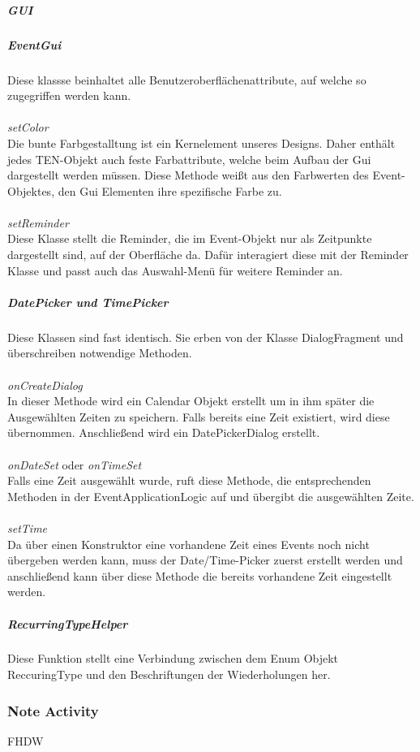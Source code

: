 \subparagraph{GUI}
\subparagraph*{EventGui}
Diese klassse beinhaltet alle Benutzeroberflächenattribute, auf welche so zugegriffen werden kann.\\
\\
\textit{setColor}\\
Die bunte Farbgestalltung ist ein Kernelement unseres Designs. Daher enthält jedes TEN-Objekt auch feste Farbattribute, welche beim Aufbau der Gui dargestellt werden müssen. Diese Methode weißt aus den Farbwerten des Event-Objektes, den Gui Elementen ihre spezifische Farbe zu.\\
\\
\textit{setReminder}\\
Diese Klasse stellt die Reminder, die im Event-Objekt nur als Zeitpunkte dargestellt sind, auf der Oberfläche da. Dafür interagiert diese mit der Reminder Klasse und passt auch das Auswahl-Menü für weitere Reminder an.

\subparagraph{DatePicker und TimePicker}
Diese Klassen sind fast identisch. Sie erben von der Klasse DialogFragment und überschreiben notwendige Methoden.\\
\\
\textit{onCreateDialog}\\
In dieser Methode wird ein Calendar Objekt erstellt um in ihm später die Ausgewählten Zeiten zu speichern. Falls bereits eine Zeit existiert, wird diese übernommen. Anschließend wird ein DatePickerDialog erstellt.\\
\\
\textit{onDateSet} oder \textit{onTimeSet}\\
Falls eine Zeit ausgewählt wurde, ruft diese Methode, die entsprechenden Methoden in der EventApplicationLogic auf und übergibt die ausgewählten Zeite.\\
\\
\textit{setTime}\\
Da über einen Konstruktor eine vorhandene Zeit eines Events noch nicht übergeben werden kann, muss der Date/Time-Picker zuerst erstellt werden und anschließend kann über diese Methode die bereits vorhandene Zeit eingestellt werden.

\subparagraph{RecurringTypeHelper}
Diese Funktion stellt eine Verbindung zwischen dem Enum Objekt ReccuringType und den Beschriftungen der Wiederholungen her.

\newpage
\subsubsection{Note Activity}
FHDW

